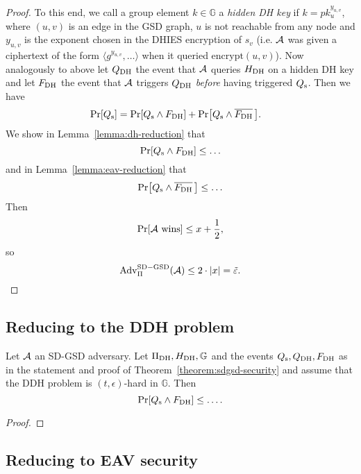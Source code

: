 \begin{proof}
	To this end, we call a group element $k \in \mathbb{G}$ a \emph{hidden DH key} if $k = pk_u^{y_{u, v}}$, where $(u, v)$ is an edge in the GSD graph, $u$ is not reachable from any node and $y_{u, v}$ is the exponent chosen in the DHIES encryption of $s_v$ (i.e. $\adv$ was given a ciphertext of the form $\langle g^{y_{u, v}}, \ldots\rangle$ when it queried $\mathrm{encrypt}(u, v)$). Now analogously to above let $\qdh$ the event that $\adv$ queries $\hdh$ on a hidden DH key and let $\fdh$ the event that $\adv$ triggers $\qdh$ \emph{before} having triggered $\qs$. Then we have
	\begin{align*}
		\pr{\qs} & = \pr{\qs \land \fdh} + \pr{\qs \land \overline{\fdh}\,}.
	\end{align*}
	We show in Lemma~\vref{lemma:dh-reduction} that
	$$
		\pr{\qs \land \fdh} \le \ldots
	$$
	and in Lemma~\vref{lemma:eav-reduction} that
	$$
		\pr{\qs \land \overline{\fdh}\,} \le \ldots
	$$
	Then
	$$
		\pr{\wins} \le x + \frac{1}{2},
	$$ so
	$$
		\mathrm{Adv}_{\Pi}^{\mathrm{SD-GSD}}(\adv) \le 2 \cdot \abs*{x} = \tilde{\epsilon}.
	$$
\end{proof}

\subsection{Reducing to the DDH problem}

\begin{lemma} \label{lemma:dh-reduction}
	Let $\adv$ an SD-GSD adversary. Let $\dhies, \hdh, \mathbb{G}$ and the events $\qs, \qdh, \fdh$ as in the statement and proof of Theorem~\vref{theorem:sdgsd-security} and assume that the DDH problem is $(t, \epsilon)$-hard in $\mathbb{G}$. Then
	$$
		\pr{\qs \land \fdh} \le \ldots.
	$$
\end{lemma}
\begin{proof}
\end{proof}

\subsection{Reducing to EAV security}


